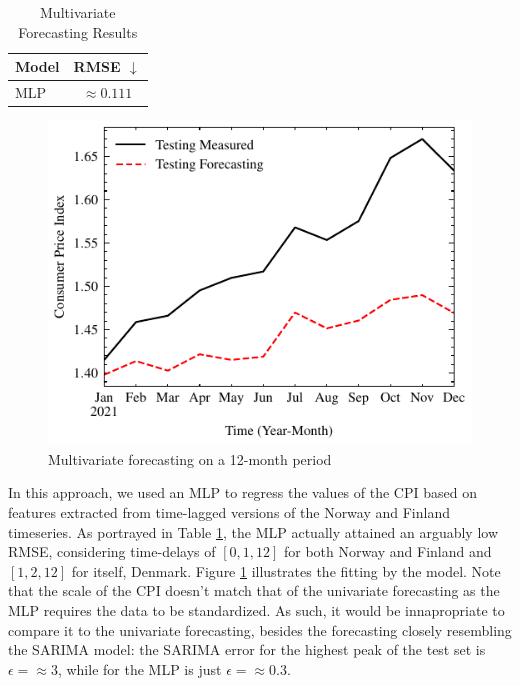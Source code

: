 \documentclass[conference]{IEEEtran}
\begin{document}
\begin{table}[btp]
    \caption{Multivariate Forecasting Results}
    \centering
    \begin{tabular}{l|c}
        Model & RMSE $\downarrow$ \\
        \hline
        MLP & $\approx 0.111$
    \end{tabular}
    \label{tab:forecasting_multi}
\end{table}

\begin{figure}[H]
    \centering
    \includegraphics{../figs/multi_forecast.pdf}
    \caption{Multivariate forecasting on a 12-month period}
    \label{fig:forecasting_multi}
\end{figure}

In this approach, we used an MLP to regress the values of the CPI based on features extracted from time-lagged versions of the Norway and Finland timeseries. As portrayed in Table \ref{tab:forecasting_multi}, the MLP actually attained an arguably low RMSE, considering time-delays of $[0,1,12]$ for both Norway and Finland and $[1,2,12]$ for itself, Denmark. Figure \ref{fig:forecasting_multi} illustrates the fitting by the model. Note that the scale of the CPI doesn't match that of the univariate forecasting as the MLP requires the data to be standardized. As such, it would be innapropriate to compare it to the univariate forecasting, besides the forecasting closely resembling the SARIMA model: the SARIMA error for the highest peak of the test set is $\epsilon=\approx 3$, while for the MLP is just $\epsilon=\approx 0.3$.
\end{document}
